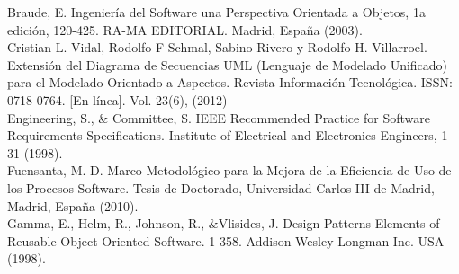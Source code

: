 \documentclass[twoside,twocolumn]{article}
\begin{document}
\begin{thebibliography}{99} %
Braude, E. Ingeniería del Software una Perspectiva Orientada a Objetos, 1a edición, 120-425. RA-MA EDITORIAL. Madrid, España (2003).\\

Cristian L. Vidal, Rodolfo F Schmal, Sabino Rivero y Rodolfo H. Villarroel. Extensión del Diagrama de Secuencias UML (Lenguaje de Modelado Unificado) para el Modelado Orientado a Aspectos. Revista Información Tecnológica. ISSN: 0718-0764. [En línea]. Vol. 23(6), (2012)\\

Engineering, S., & Committee, S. IEEE Recommended Practice for Software Requirements Specifications. Institute of Electrical and Electronics Engineers, 1-31 (1998).\\

Fuensanta, M. D. Marco Metodológico para la Mejora de la Eficiencia de Uso de los Procesos Software. Tesis de Doctorado, Universidad Carlos III de Madrid, Madrid, España (2010). \\

Gamma, E., Helm, R., Johnson, R., &Vlisides, J. Design Patterns Elements of Reusable Object Oriented Software. 1-358. Addison Wesley Longman Inc. USA (1998).\\
 
 
\end{thebibliography}

\end{document}
